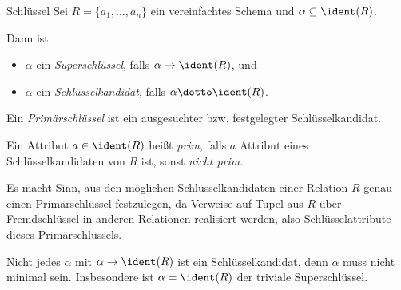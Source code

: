 \begin{defi}{Schlüssel}
    Sei $R = \{ a_1, \ldots, a_n \}$ ein vereinfachtes Schema und $\alpha \subseteq \ident(R)$.

    Dann ist
    \begin{itemize}
        \item $\alpha$ ein \emph{Superschlüssel}, falls $\alpha \to \ident(R)$, und
        \item $\alpha$ ein \emph{Schlüsselkandidat}, falls $\alpha \dotto \ident(R)$.
    \end{itemize}

    Ein \emph{Primärschlüssel} ist ein ausgesuchter bzw. festgelegter Schlüsselkandidat.

    Ein Attribut $a \in \ident(R)$ heißt \emph{prim}, falls $a$ Attribut eines Schlüsselkandidaten von $R$ ist, sonst \emph{nicht prim}.

    Es macht Sinn, aus den möglichen Schlüsselkandidaten einer Relation $R$ genau einen Primärschlüssel festzulegen, da Verweise auf Tupel aus $R$ über Fremdschlüssel in anderen Relationen realisiert werden, also Schlüsselattribute dieses Primärschlüssels.

    Nicht jedes $\alpha$ mit $\alpha \to \ident(R)$ ist ein Schlüsselkandidat, denn $\alpha$ muss nicht minimal sein.
    Insbesondere ist $\alpha = \ident(R)$ der triviale Superschlüssel.
\end{defi}

